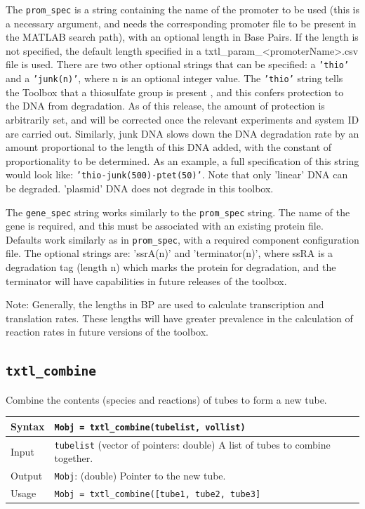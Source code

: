 \documentclass[english]{report}
\begin{document}
			\vspace{1\baselineskip}
						
The \texttt{prom\_spec} is a string containing the name of the promoter to be used (this is a necessary argument, and needs the corresponding promoter file to be present in the MATLAB search path), with an optional length in Base Pairs. If the length is not specified, the default length specified in a \textsf{txtl\_param\_<promoterName>.csv} file is used. There are two other optional strings that can be specified: a \texttt{'thio'} and a \texttt{'junk(n)'}, where n is an optional integer value. The \texttt{'thio'} string tells the Toolbox that a thiosulfate group is present , and this confers protection to the DNA from degradation. As of this release, the amount of protection is arbitrarily set, and will be corrected once the relevant experiments and system ID are carried out. Similarly, junk DNA slows down the DNA degradation rate by an amount proportional to the length of this DNA added, with the constant of proportionality to be determined. As an example, a full specification of this string would look like: \texttt{'thio-junk(500)-ptet(50)'}. Note that only 'linear' DNA can be degraded. 'plasmid' DNA does not degrade in this toolbox. 

The \texttt{gene\_spec} string works similarly to the \texttt{prom\_spec} string. The name of the gene is required, and this must be associated with an existing protein file. Defaults work similarly as in \texttt{prom\_spec}, with a required component configuration file. The optional strings are: 'ssrA(n)' and 'terminator(n)', where ssRA is a degradation tag (length n) which marks the protein for degradation, and the terminator will have capabilities in future releases of the toolbox. 

Note: Generally, the lengths in BP are used to calculate transcription and translation rates. These lengths will have greater prevalence in the calculation of reaction rates in future versions of the toolbox. 

		\subsection*{\texttt{txtl\_combine}}
				Combine the contents (species and reactions) of tubes to form a new tube. \\	
			
			\begin{tabular}{p{2cm}|p{13cm}}
			Syntax & \texttt{Mobj = txtl\_combine(tubelist, vollist)}\\ \hline
			Input & \texttt{tubelist} (vector of pointers: double) A list of tubes to combine together. \\ \hline
			Output & \texttt{Mobj}: (double) Pointer to the new tube.\\ \hline
			Usage & \texttt{Mobj = txtl\_combine([tube1, tube2, tube3]}\\
			\end{tabular}
				
\end{document}
